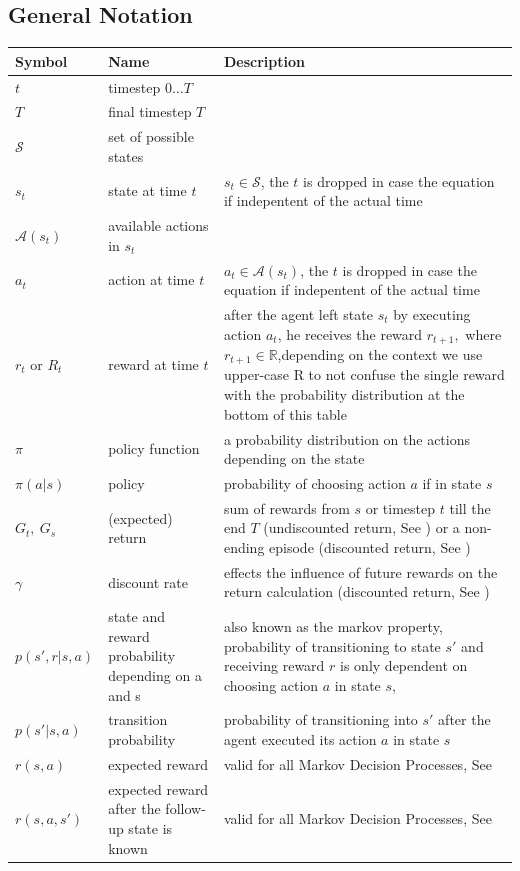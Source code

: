 \documentclass[a4paper,12pt]{scrartcl}
\begin{document}
\subsection{General Notation}
\begin{tabular}{C{0.1\textwidth}p{0.3\textwidth}p{0.6\textwidth}}
	\toprule
	Symbol & Name &  Description \\
	\midrule
	$t$ & timestep $0 \dots T$ & \\
	$T$ & final timestep $T$ & \\
	$\mathcal{S}$ & set of possible states & \\
	$s_t$ & state at time $t$ &  $s_t \in \mathcal{S}$, the $t$ is dropped in case the equation if indepentent of the actual time\\
	$\mathcal{A}(s_t)$ & available actions in $s_t$ & \\
	$a_t$ & action at time $t$ & $a_t \in \mathcal{A}(s_t)$, the $t$ is dropped in case the equation if indepentent of the actual time \\
	$r_t$ or $R_t$ & reward at time $t$ & after the agent left state $s_t$ by executing action $a_t$, he receives the reward $r_{t+1},$ where $r_{t+1} \in \mathbb{R}$,\newline depending on the context we use upper-case R to not confuse the single reward with the probability distribution at the bottom of this table\\
	$\pi$ & policy function & a probability distribution on the actions depending on the state\\
	$\pi(a\vert s)$ & policy & probability of choosing action $a$ if in state $s$\\
	$G_t,~G_s$ & (expected) return & sum of rewards from $s$ or timestep $t$ till the end $T$ (undiscounted return, See ) or a non-ending episode (discounted return, See )\\
	$\gamma$ & discount rate & effects the influence of future rewards on the return calculation (discounted return, See )\\
	$p(s', r|s,a)$ & state and reward probability depending on a and s & also known as the markov property, probability of transitioning to state $s'$ and receiving reward $r$ is only dependent on choosing action $a$ in state $s$, \newline \\
	$p(s'\vert s,a)$ & transition probability & probability of transitioning into $s'$ after the agent executed its action $a$ in state $s$\\
	$r(s,a)$ & expected reward & valid for all Markov Decision Processes, \newline See  \\
	$r(s,a,s')$ & expected reward after the follow-up state is known& valid for all Markov Decision Processes, \newline See  \\
	\bottomrule
\end{tabular}
\end{document}

